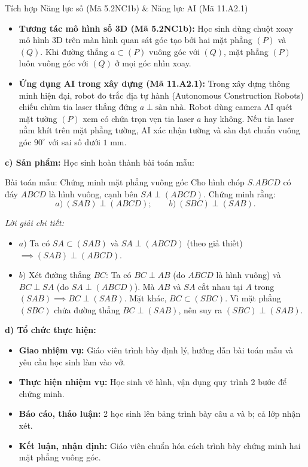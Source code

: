 \documentclass[12pt, a4paper]{article}
\begin{document}
\begin{aibox}{Tích hợp Năng lực số (Mã 5.2NC1b) \& Năng lực AI (Mã 11.A2.1)}
\begin{itemize}[leftmargin=0.6cm]
    \item \textbf{Tương tác mô hình số 3D (Mã 5.2NC1b):} Học sinh dùng chuột xoay mô hình 3D trên màn hình quan sát góc tạo bởi hai mặt phẳng $(P)$ và $(Q)$. Khi đường thẳng $a \subset (P)$ vuông góc với $(Q)$, mặt phẳng $(P)$ luôn vuông góc với $(Q)$ ở mọi góc nhìn xoay.
    \item \textbf{Ứng dụng AI trong xây dựng (Mã 11.A2.1):} Trong xây dựng thông minh hiện đại, robot đo trắc địa tự hành (Autonomous Construction Robots) chiếu chùm tia laser thẳng đứng $a \perp \text{sàn nhà}$. Robot dùng camera AI quét mặt tường $(P)$ xem có chứa trọn vẹn tia laser $a$ hay không. Nếu tia laser nằm khít trên mặt phẳng tường, AI xác nhận tường và sàn đạt chuẩn vuông góc $90^\circ$ với sai số dưới $1\text{ mm}$.
\end{itemize}
\end{aibox}

\noindent \textbf{c) Sản phẩm:}
Học sinh hoàn thành bài toán mẫu:
\begin{pedabox}{Bài toán mẫu: Chứng minh mặt phẳng vuông góc}
Cho hình chóp $S.ABCD$ có đáy $ABCD$ là hình vuông, cạnh bên $SA \perp (ABCD)$.
Chứng minh rằng:
$$a) \ (SAB) \perp (ABCD); \qquad b) \ (SBC) \perp (SAB).$$
\end{pedabox}
\textit{Lời giải chi tiết:}
\begin{itemize}
    \item $a)$ Ta có $SA \subset (SAB)$ và $SA \perp (ABCD)$ (theo giả thiết) $\implies (SAB) \perp (ABCD)$.
    \item $b)$ Xét đường thẳng $BC$:
    Ta có $BC \perp AB$ (do $ABCD$ là hình vuông) và $BC \perp SA$ (do $SA \perp (ABCD)$).
    Mà $AB$ và $SA$ cắt nhau tại $A$ trong $(SAB) \implies BC \perp (SAB)$.
    Mặt khác, $BC \subset (SBC)$.
    Vì mặt phẳng $(SBC)$ chứa đường thẳng $BC \perp (SAB)$, nên suy ra $(SBC) \perp (SAB)$.
\end{itemize}

\noindent \textbf{d) Tổ chức thực hiện:}
\begin{itemize}[leftmargin=0.6cm]
    \item \textbf{Giao nhiệm vụ:} Giáo viên trình bày định lý, hướng dẫn bài toán mẫu và yêu cầu học sinh làm vào vở.
    \item \textbf{Thực hiện nhiệm vụ:} Học sinh vẽ hình, vận dụng quy trình 2 bước để chứng minh.
    \item \textbf{Báo cáo, thảo luận:} 2 học sinh lên bảng trình bày câu a và b; cả lớp nhận xét.
    \item \textbf{Kết luận, nhận định:} Giáo viên chuẩn hóa cách trình bày chứng minh hai mặt phẳng vuông góc.
\end{itemize}
\end{document}
